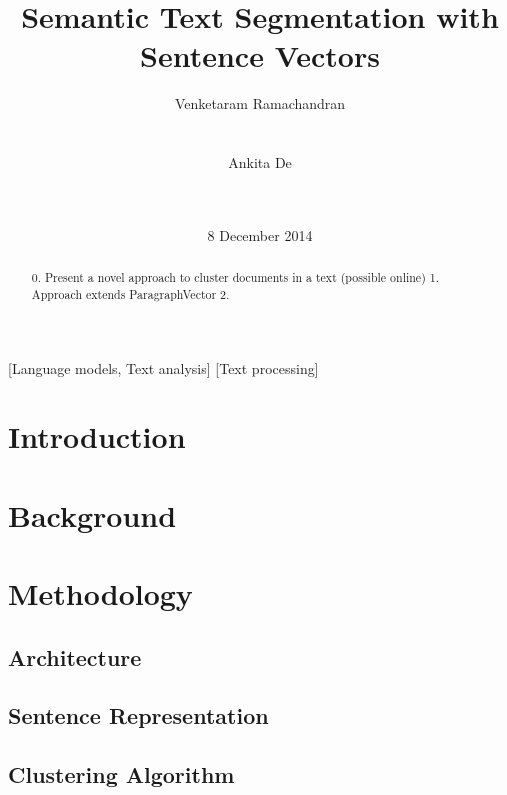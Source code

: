 \documentclass{sig-alternate}
\begin{document}
\title{Semantic Text Segmentation with Sentence Vectors}

\author{
\alignauthor Venketaram Ramachandran\\
       \\
       \\
\alignauthor Ankita De\\
       \\
       \\
}

\date{8 December 2014}
\maketitle
\begin{abstract}
0. Present a novel approach to cluster documents in a text (possible online)
1. Approach extends ParagraphVector
2.
\end{abstract}

[Language models, Text analysis]
[Text processing]



\section{Introduction}
\section{Background}
\section{Methodology}
\subsection{Architecture}
\subsection{Sentence Representation}
\subsection{Clustering Algorithm}
\end{document}
